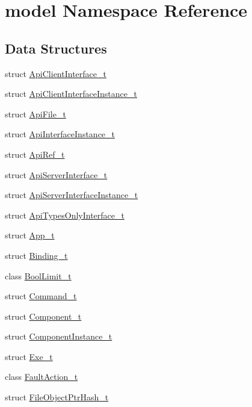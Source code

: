 \hypertarget{namespacemodel}{}\section{model Namespace Reference}
\label{namespacemodel}
\subsection*{Data Structures}
\begin{DoxyCompactItemize}
\item 
struct \hyperlink{structmodel_1_1_api_client_interface__t}{Api\+Client\+Interface\+\_\+t}
\item 
struct \hyperlink{structmodel_1_1_api_client_interface_instance__t}{Api\+Client\+Interface\+Instance\+\_\+t}
\item 
struct \hyperlink{structmodel_1_1_api_file__t}{Api\+File\+\_\+t}
\item 
struct \hyperlink{structmodel_1_1_api_interface_instance__t}{Api\+Interface\+Instance\+\_\+t}
\item 
struct \hyperlink{structmodel_1_1_api_ref__t}{Api\+Ref\+\_\+t}
\item 
struct \hyperlink{structmodel_1_1_api_server_interface__t}{Api\+Server\+Interface\+\_\+t}
\item 
struct \hyperlink{structmodel_1_1_api_server_interface_instance__t}{Api\+Server\+Interface\+Instance\+\_\+t}
\item 
struct \hyperlink{structmodel_1_1_api_types_only_interface__t}{Api\+Types\+Only\+Interface\+\_\+t}
\item 
struct \hyperlink{structmodel_1_1_app__t}{App\+\_\+t}
\item 
struct \hyperlink{structmodel_1_1_binding__t}{Binding\+\_\+t}
\item 
class \hyperlink{classmodel_1_1_bool_limit__t}{Bool\+Limit\+\_\+t}
\item 
struct \hyperlink{structmodel_1_1_command__t}{Command\+\_\+t}
\item 
struct \hyperlink{structmodel_1_1_component__t}{Component\+\_\+t}
\item 
struct \hyperlink{structmodel_1_1_component_instance__t}{Component\+Instance\+\_\+t}
\item 
struct \hyperlink{structmodel_1_1_exe__t}{Exe\+\_\+t}
\item 
class \hyperlink{classmodel_1_1_fault_action__t}{Fault\+Action\+\_\+t}
\item 
struct \hyperlink{structmodel_1_1_file_object_ptr_hash__t}{File\+Object\+Ptr\+Hash\+\_\+t}

\end{DoxyCompactItemize}
